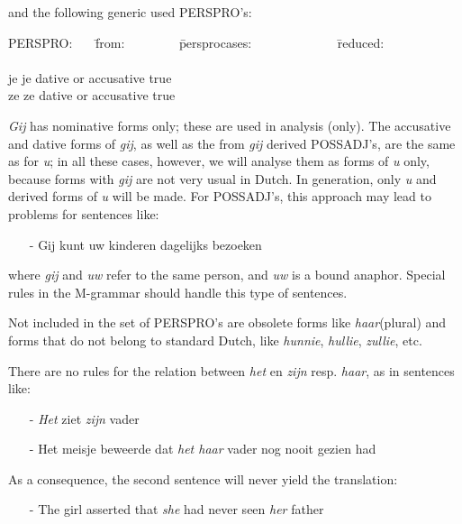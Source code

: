 \begin{itemize}
and the following generic used PERSPRO's:

\begin{tabbing}
PERSPRO: \ \ \  \= from: \ \ \ \ \ \ \ \ \= persprocases: \ \ \ \ \ \ \  
\ \ \ \ \ \  \= reduced: \\
          \>         \>                       \>       \\
je        \>     je  \>  dative or accusative \> true \\ 
ze        \>     ze  \>  dative or accusative \> true \\ 
\end{tabbing}

{\em Gij} has nominative forms only; these are used in analysis (only). The 
accusative
and dative forms of {\em gij}, as well as the from {\em gij} 
derived POSSADJ's, are the
same as for {\em u}; in all these cases, however, we will analyse them as 
forms of 
{\em u} only, because forms with {\em gij} are not very usual in Dutch. In 
generation, only {\em u} and derived forms of {\em u} will be made. For 
POSSADJ's, this approach may lead to problems for sentences like:
\begin{itemize}
   \item [-] Gij kunt uw kinderen dagelijks bezoeken
\end{itemize}
where {\em gij} and {\em uw} refer to the same person, and {\em uw} is a 
bound anaphor. 
Special rules in the M-grammar should handle this type of sentences.

\end{itemize}

Not included in the set of PERSPRO's are obsolete forms like {\em haar}(plural)
and forms that do not belong to standard Dutch, like {\em hunnie}, 
{\em hullie}, {\em zullie}, etc.

There are no rules for the relation between {\em het} en {\em zijn} resp. 
{\em haar}, as
in sentences like:

\begin{itemize}
  \item [-] {\em Het} ziet {\em zijn} vader
  \item [-] Het meisje beweerde dat {\em het haar} vader nog nooit gezien had
\end{itemize}

As a consequence, the second sentence will never yield the translation:

\begin{itemize}
  \item [-] The girl asserted that {\em she} had never seen {\em her} father
\end{itemize}

